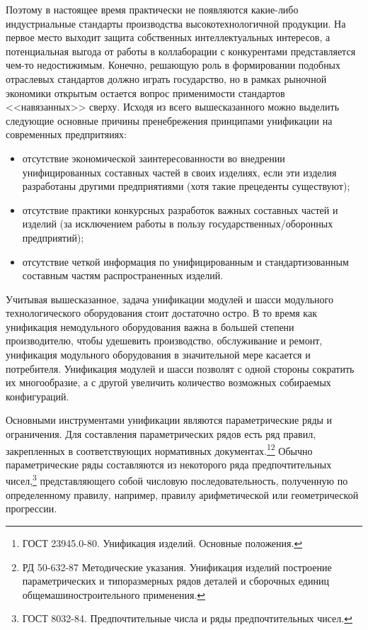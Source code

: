 Поэтому в настоящее время практически не появляются какие-либо индустриальные стандарты производства высокотехнологичной продукции. На первое место выходит защита собственных интеллектуальных интересов, а потенциальная выгода от работы в коллаборации с конкурентами представляется чем-то недостижимым. Конечно, решающую роль в формировании подобных отраслевых стандартов должно играть государство, но в рамках рыночной экономики открытым остается вопрос применимости стандартов <<навязанных>> сверху. Исходя из всего вышесказанного можно выделить следующие основные причины пренебрежения принципами унификации на современных предпритяиях:

\begin{itemize}
	\item отсутствие экономической заинтересованности во внедрении унифицированных составных частей в своих изделиях, если эти изделия разработаны другими предприятиями (хотя такие прецеденты существуют);
	\item отсутствие практики конкурсных разработок важных составных частей и изделий (за исключением работы в пользу государственных/оборонных предприятий);
	\item отсутствие четкой информация по унифицированным и стандартизованным составным частям распространенных изделий.
\end{itemize}

Учитывая вышесказанное, задача унификации модулей и шасси модульного технологического оборудования стоит достаточно остро. В то время как унификация немодульного оборудования важна в большей степени производителю, чтобы удешевить производство, обслуживание и ремонт, унификация модульного оборудования в значительной мере касается и потребителя. Унификация модулей и шасси позволят с одной стороны сократить их многообразие, а с другой увеличить количество возможных собираемых конфигураций. 

Основными инструментами унификации являются параметрические ряды и ограничения. Для составления параметрических рядов есть ряд правил, закрепленных в соответствующих нормативных документах.\footnote{ГОСТ 23945.0-80. Унификация изделий. Основные положения.}\footnote{РД 50-632-87 Методические указания. Унификация изделий построение параметрических и типоразмерных рядов деталей и сборочных единиц общемашиностроительного применения.} Обычно параметрические ряды составляются из некоторого ряда предпочтительных чисел,\footnote{ГОСТ 8032-84. Предпочтительные числа и ряды предпочтительных чисел.} представляющего собой числовую последовательность, полученную по определенному правилу, например, правилу арифметической или геометрической прогрессии.

